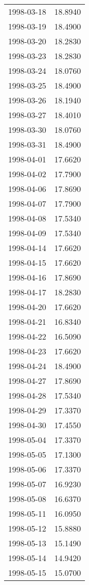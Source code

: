 \begin{tabular}{lr}
1998-03-18 &     18.8940 \\
1998-03-19 &     18.4900 \\
1998-03-20 &     18.2830 \\
1998-03-23 &     18.2830 \\
1998-03-24 &     18.0760 \\
1998-03-25 &     18.4900 \\
1998-03-26 &     18.1940 \\
1998-03-27 &     18.4010 \\
1998-03-30 &     18.0760 \\
1998-03-31 &     18.4900 \\
1998-04-01 &     17.6620 \\
1998-04-02 &     17.7900 \\
1998-04-06 &     17.8690 \\
1998-04-07 &     17.7900 \\
1998-04-08 &     17.5340 \\
1998-04-09 &     17.5340 \\
1998-04-14 &     17.6620 \\
1998-04-15 &     17.6620 \\
1998-04-16 &     17.8690 \\
1998-04-17 &     18.2830 \\
1998-04-20 &     17.6620 \\
1998-04-21 &     16.8340 \\
1998-04-22 &     16.5090 \\
1998-04-23 &     17.6620 \\
1998-04-24 &     18.4900 \\
1998-04-27 &     17.8690 \\
1998-04-28 &     17.5340 \\
1998-04-29 &     17.3370 \\
1998-04-30 &     17.4550 \\
1998-05-04 &     17.3370 \\
1998-05-05 &     17.1300 \\
1998-05-06 &     17.3370 \\
1998-05-07 &     16.9230 \\
1998-05-08 &     16.6370 \\
1998-05-11 &     16.0950 \\
1998-05-12 &     15.8880 \\
1998-05-13 &     15.1490 \\
1998-05-14 &     14.9420 \\
1998-05-15 &     15.0700 \\

\end{tabular}
